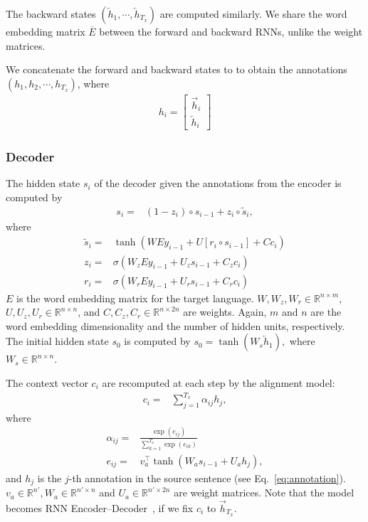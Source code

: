 \documentclass{article}
\newcommand{\RR}[0]{\mathbb{R}}
\newcommand{\ola}{\overleftarrow}
\newcommand{\ora}{\overrightarrow}
\newcommand{\ov}{\overline}
\begin{document}
The backward states $(\ola{h}_1, \cdots, \ola{h}_{T_x})$ are computed similarly.
We share the word embedding matrix $\ov{E}$ between the forward and backward
RNNs, unlike the weight matrices.

We concatenate the forward and backward states to to obtain the annotations
$(h_1, h_2, \cdots, h_{T_x})$, where
\begin{align}
    \label{eq:annotation}
    h_i = \left[ 
        \begin{array}{c}
    \ora{h}_i \\
    \ola{h}_i 
\end{array}
\right]
    \end{align}

\subsubsection{Decoder}

The hidden state $s_i$ of the decoder given the annotations from the encoder is
computed by
\begin{align*}
    s_i =& (1 - z_i) \circ s_{i-1} + z_i \circ \tilde{s}_i,
\end{align*}
where
\begin{align*}
    \tilde{s}_{i} =& \tanh \left( W E y_{i - 1} + U \left[ r_i \circ s_{i - 1} \right] +
    C c_i \right) \\ 
    z_i =& \sigma\left( W_z E y_{i - 1} + U_z s_{i-1} 
    + C_z c_i \right)\\
    r_i =& \sigma\left( W_r E y_{i - 1} + U_r s_{i-1}
    + C_r c_i \right)
\end{align*}
$E$ is the word embedding matrix for the target language.
$W, W_z, W_r \in \mathbb{R}^{n\times m}$, 
$U, U_z, U_r \in \mathbb{R}^{n\times n}$, and
$C, C_z, C_r \in \mathbb{R}^{n\times 2n}$ are weights. Again, $m$ and $n$ are the word
embedding dimensionality and the number of hidden units, respectively.
The initial hidden state $s_0$ is computed by 
$
    s_{0} = \tanh\left( W_s \ola{h}_1 \right),
$
where $W_s \in \RR^{n \times n}$.

The context vector $c_i$ are recomputed at each step by the alignment model:
\begin{align*}
    c_i =& \sum_{j=1}^{T_x} \alpha_{ij} h_j,
\end{align*}
where
\begin{align*}
    \alpha_{ij} =& \frac{\exp\left(e_{ij}\right)}{\sum_{k=1}^{T_x}
    \exp\left(e_{ik}\right)}  \\
    e_{ij} =& v_a^{\top} \tanh\left( W_a s_{i-1} + U_a h_j \right),
\end{align*}
and $h_j$ is the $j$-th annotation in the source sentence (see
Eq.~\eqref{eq:annotation}).  $v_a \in \mathbb{R}^{n'}, W_a \in
\mathbb{R}^{n'\times n}$ and $U_a \in \mathbb{R}^{n'\times  2n}$ are weight
matrices.  Note that the model becomes
RNN Encoder--Decoder~\citep{Cho2014}, if we fix $c_i$ to $\ora{h}_{T_x}$.
\end{document}
